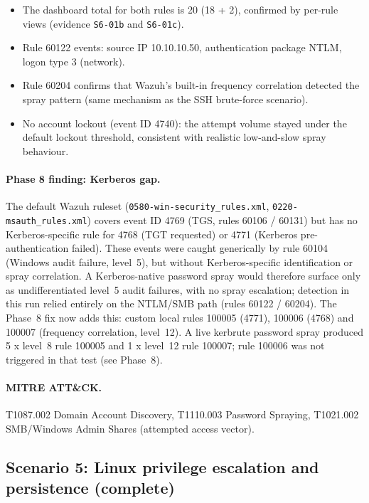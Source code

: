 \documentclass[11pt,a4paper]{article}
\begin{document}
\begin{itemize}
  \item The dashboard total for both rules is 20 (18 + 2), confirmed by
        per-rule views (evidence \texttt{S6-01b} and \texttt{S6-01c}).
  \item Rule 60122 events: source IP 10.10.10.50, authentication package
        NTLM, logon type 3 (network).
  \item Rule 60204 confirms that Wazuh's built-in frequency correlation
        detected the spray pattern (same mechanism as the SSH brute-force
        scenario).
  \item No account lockout (event ID 4740): the attempt volume stayed under
        the default lockout threshold, consistent with realistic low-and-slow
        spray behaviour.
\end{itemize}

\paragraph{Phase 8 finding: Kerberos gap.} The default Wazuh ruleset
(\texttt{0580-win-\allowbreak security\_\allowbreak rules.xml},
\texttt{0220-msauth\_\allowbreak rules.xml})
covers event ID 4769 (TGS, rules 60106 / 60131) but has no Kerberos-specific
rule for 4768 (TGT requested) or 4771 (Kerberos pre-authentication failed).
These events were caught generically by rule 60104 (Windows audit failure,
level~5), but without Kerberos-specific identification or spray correlation.
A Kerberos-native password spray would therefore surface only as
undifferentiated level~5 audit failures, with no spray escalation; detection
in this run relied entirely on the NTLM/SMB path (rules 60122 / 60204). The
Phase~8 fix now adds this: custom local rules 100005 (4771), 100006 (4768)
and 100007 (frequency correlation, level~12). A live kerbrute password spray
produced 5 x level~8 rule 100005 and 1 x level~12 rule 100007; rule 100006
was not triggered in that test (see Phase~8).

\paragraph{MITRE ATT\&CK.} T1087.002 Domain Account Discovery, T1110.003
Password Spraying, T1021.002 SMB/Windows Admin Shares (attempted access
vector).

\subsection{Scenario 5: Linux privilege escalation and persistence (complete)}
\end{document}
